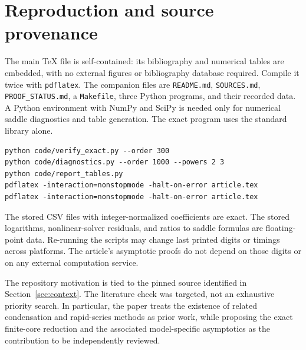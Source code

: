 \documentclass[11pt,a4paper]{article}
\numberwithin{equation}{section}
\theoremstyle{definition}
\theoremstyle{remark}
\begin{document}
\section{Reproduction and source provenance}
\label{app:reproduction}

The main TeX file is self-contained: its bibliography and numerical tables
are embedded, with no external figures or bibliography database required.
Compile it twice with \texttt{pdflatex}. The companion files are
\texttt{README.md}, \texttt{SOURCES.md}, \texttt{PROOF\_STATUS.md}, a
\texttt{Makefile}, three Python programs, and their recorded data.
A Python environment with NumPy and SciPy is needed only for numerical
saddle diagnostics and table generation. The exact program uses the standard
library alone.

\begin{verbatim}
python code/verify_exact.py --order 300
python code/diagnostics.py --order 1000 --powers 2 3
python code/report_tables.py
pdflatex -interaction=nonstopmode -halt-on-error article.tex
pdflatex -interaction=nonstopmode -halt-on-error article.tex
\end{verbatim}

The stored CSV files with integer-normalized coefficients are exact.
The stored logarithms, nonlinear-solver residuals, and ratios to saddle
formulas are floating-point data. Re-running the scripts may change last
printed digits or timings across platforms. The article's asymptotic
proofs do not depend on those digits or on any external computation service.

The repository motivation is tied to the pinned source identified in
Section~\ref{sec:context}. The literature check was targeted, not an
exhaustive priority search. In particular, the paper treats the existence of
related condensation and rapid-series methods as prior work, while proposing
the exact finite-core reduction and the associated model-specific
asymptotics as the contribution to be independently reviewed.
\end{document}
